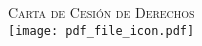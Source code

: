 
\newpage
\thispagestyle{empty}
\begin{center}

  \vspace*{\fill}

  \Large\textsc{Carta de Cesión de Derechos}\\[0.2cm]
  \texttt{[image: pdf\_file\_icon.pdf]}

  \vspace*{\fill}

\end{center}
\cleardoublepage
